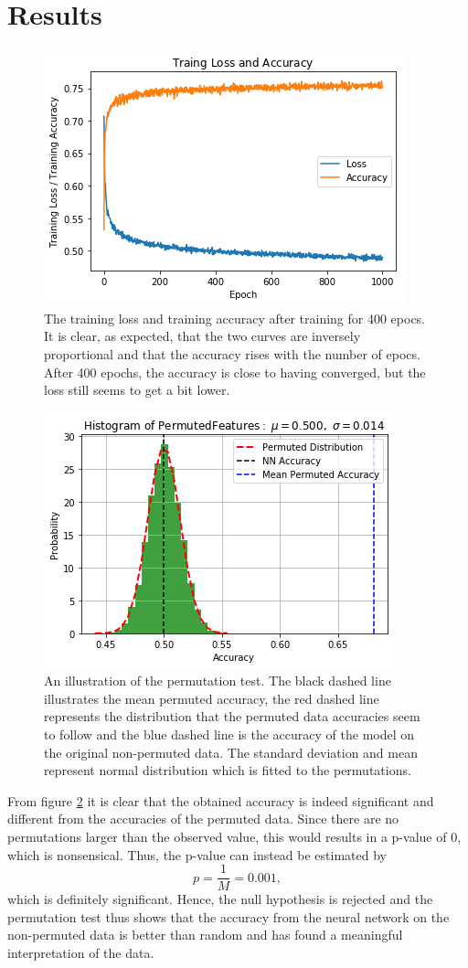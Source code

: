 \documentclass[11pt, fleqn, titlepage]{article}
\begin{document}
	\section{Results}\label{results}
	
	\begin{figure}[H]
		\centering
		\includegraphics[width=0.5\linewidth]{imgs/loss_curve.png}
		\caption{The training loss and training accuracy after training for 400 epocs. It is clear, as expected, that the two curves are inversely proportional and that the accuracy rises with the number of epocs. After 400 epochs, the accuracy is close to having converged, but the loss still seems to get a bit lower.}
		\label{fig:losscurve}
	\end{figure}

	\begin{figure}[H]
		\centering
		\includegraphics[width=0.5\linewidth]{imgs/perm_test.png}
		\caption{An illustration of the permutation test. The black dashed line illustrates the mean permuted accuracy, the red dashed line represents the distribution that the permuted data accuracies seem to follow and the blue dashed line is the accuracy of the model on the original non-permuted data. The standard deviation and mean represent normal distribution which is fitted to the permutations.}
		\label{fig:permtest}
	\end{figure}\noindent
	From figure \ref{fig:permtest} it is clear that the obtained accuracy is indeed significant and different from the accuracies of the permuted data. Since there are no permutations larger than the observed value, this would results in a p-value of 0, which is nonsensical. Thus, the p-value can instead be estimated by \cite{p-value}
	\[p=\frac{1}{M}=0.001,\]
	which is definitely significant. Hence, the null hypothesis is rejected and the permutation test thus shows that the accuracy from the neural network on the non-permuted data is better than random and has found a meaningful interpretation of the data. 
	
\end{document}
